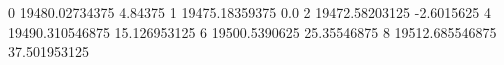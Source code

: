 0 19480.02734375 4.84375
1 19475.18359375 0.0
2 19472.58203125 -2.6015625
4 19490.310546875 15.126953125
6 19500.5390625 25.35546875
8 19512.685546875 37.501953125
